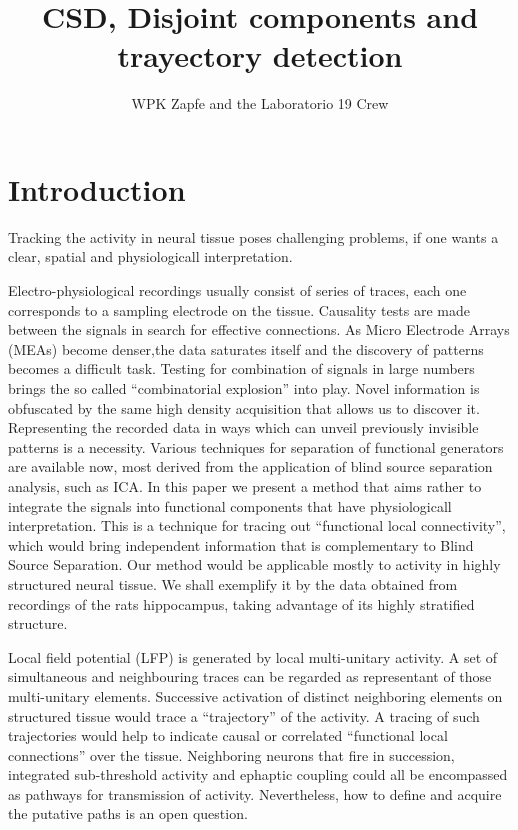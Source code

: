 \documentclass[11pt, letterpaper]{article}
\author{WPK Zapfe and the Laboratorio 19 Crew}
\title{CSD, Disjoint components and trayectory detection}
\begin{document}
\maketitle

\section{Introduction}

Tracking the activity in neural tissue poses challenging problems, if one
wants a clear, spatial and physiologicall interpretation.

Electro-physiological recordings usually consist of 
 series of traces, each one corresponds to a sampling
electrode on the tissue. Causality tests are made between the
signals in search for effective connections. 
As Micro Electrode Arrays (MEAs) become denser,the data saturates itself
and the discovery of patterns becomes a difficult task.
Testing for combination of signals in large numbers
brings the so called ``combinatorial explosion'' into
play. 
Novel information is obfuscated by the same high density acquisition that allows us to
discover it. Representing  the recorded data in ways which can unveil previously
invisible patterns is a necessity. Various techniques for separation of functional
generators are available now, most derived from the application of blind source
separation analysis, such as ICA.
In this paper we present a method that aims rather to integrate
the signals into functional components that
have physiologicall interpretation.
This is a technique for tracing out
``functional local connectivity'', which would bring independent information
that is complementary to Blind Source Separation.
Our  method would be applicable mostly to
activity in highly structured neural tissue. We shall exemplify it by
the data obtained from recordings of the rats hippocampus,
taking advantage of its highly stratified  structure. 

Local field potential (LFP)
is generated by local multi-unitary activity.
A set of simultaneous and neighbouring traces
can be regarded as representant
of those multi-unitary elements. 
Successive activation  of distinct neighboring elements on structured
tissue would trace a
``trajectory'' of the activity. A tracing of such trajectories would help to indicate
causal or correlated ``functional local connections'' over the tissue. Neighboring
neurons that fire in succession, integrated sub-threshold activity and ephaptic coupling
could all be encompassed as pathways for transmission of activity. Nevertheless,
how to define and acquire the putative paths is an open question.
\end{document}
